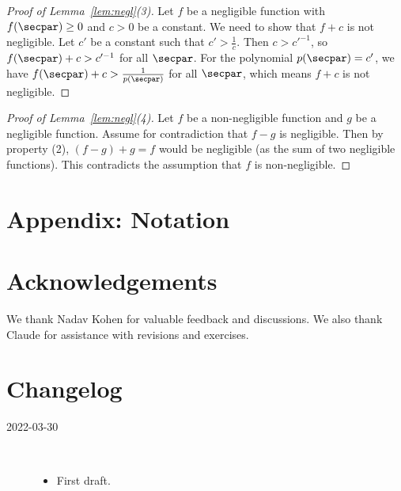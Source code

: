 \documentclass[
  a4paper,
  orivec,oribibl]{llncs}
\begin{document}
\begin{proof}[Proof of Lemma~\ref{lem:negl}(3)]
  Let $f$ be a negligible function with $f(\secpar) \ge 0$ and $c > 0$ be a constant.
  We need to show that $f + c$ is not negligible.
  Let $c'$ be a constant such that $c' > \frac{1}{c}$.
  Then $c > c'^{-1}$, so $f(\secpar) + c > c'^{-1}$ for all $\secpar$.
  For the polynomial $p(\secpar) = c'$, we have $f(\secpar) + c > \frac{1}{p(\secpar)}$ for all $\secpar$, which means $f + c$ is not negligible.
\end{proof}

\begin{proof}[Proof of Lemma~\ref{lem:negl}(4)]
  Let $f$ be a non-negligible function and $g$ be a negligible function.
  Assume for contradiction that $f - g$ is negligible.
  Then by property (2), $(f - g) + g = f$ would be negligible (as the sum of two negligible functions).
  This contradicts the assumption that $f$ is non-negligible.
\end{proof}

\section{Appendix: Notation}\label{sec:appendix-notation}

\section*{Acknowledgements}
We thank Nadav Kohen for valuable feedback and discussions.
We also thank Claude for assistance with revisions and exercises.

\iffull

  \section*{Changelog}\label{sec:changelog}
  \begin{description}
    \item[2022-03-30]\
          \begin{itemize}
            \item First draft.
          \end{itemize}
  \end{description}
  \vspace{-2em}
\fi

{}
\printbibliography\label{sec:bib}
\end{document}
